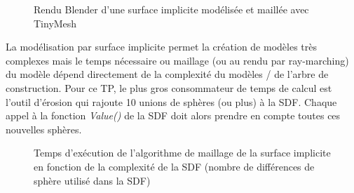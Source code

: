 \begin{figure}[h!]

	\caption{Rendu Blender d'une surface implicite modélisée et maillée avec TinyMesh}
\end{figure}
\FloatBarrier

La modélisation par surface implicite permet la création de modèles très complexes mais le temps nécessaire ou maillage (ou au rendu par ray-marching) du modèle
dépend directement de la complexité du modèles / de l'arbre de construction. Pour ce TP, le plus gros consommateur de temps de calcul est l'outil d'érosion qui rajoute 
10 unions de sphères (ou plus) à la SDF. Chaque appel à la fonction \textit{Value()} de la SDF doit alors prendre en compte toutes ces nouvelles sphères.

\begin{figure}[h!]

	\caption{Temps d'exécution de l'algorithme de maillage de la surface implicite en fonction de la complexité de la SDF (nombre de différences de sphère utilisé dans la SDF)}
\end{figure}
\FloatBarrier

